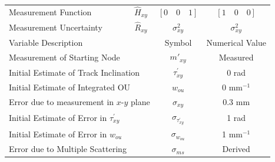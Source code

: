 \begin{table}[!htbp]
\begin{center}
\begin{threeparttable}
\begin{tabular}{lccc}
Measurement Function
& $\hat{H}_{xy}$ 
& $[0 \quad 0 \quad 1]$
& $[1 \quad 0 \quad 0]$
\\
\rule{0pt}{3ex}%

Measurement Uncertainty
& $\hat{R}_{xy}$ 
& $\sigma_{xy}^{2}$
& $\sigma_{xy}^{2}$
\\



\bottomrule

\multicolumn{2}{l}{Variable Description} 
& Symbol & Numerical Value  \\
\hline


\multicolumn{2}{l}{Measurement of Starting Node} 
& $m'_{xy}$ & Measured \\

\multicolumn{2}{l}{Initial Estimate of Track Inclination} 
& $\tau^{'}_{xy}$ & 0 rad \\

\multicolumn{2}{l}{Initial Estimate of Integrated OU\tnote{*}}
& $w_{ou}$ & 0 mm$^{-1}$ \\

\multicolumn{2}{l}{Error due to measurement in $x$-$y$ plane} 
& $\sigma_{xy}$ & 0.3 mm \\

\multicolumn{2}{l}{Initial Estimate of Error in $\tau^{'}_{xy}$} 
& $\sigma_{\tau^{'}_{xy}}$ & 1 rad \\

\multicolumn{2}{l}{Initial Estimate of Error in $w_{ou}$} 
& $\sigma_{w_{ou}}$ & 1 mm$^{-1}$ \\

\multicolumn{2}{l}{Error due to Multiple Scattering} 
& $\sigma_{ms}$ & Derived \\


\end{tabular}
\end{threeparttable}
\end{center}
\end{table}

